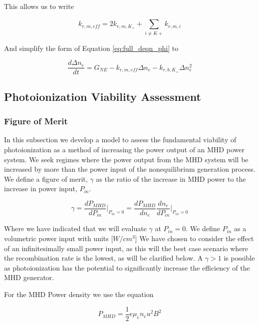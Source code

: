 This allows us to write

\begin{equation}
  k_{r, m, eff} = 2k_{r, m, K_{+}} + \sum_{i \neq K+}^{}k_{r, m, i}
\end{equation}

And simplify the form of Equation \ref{eq:full_deqn_phi} to

\begin{equation}
  \label{eq:final_deqn_Kp}
\frac{d\Delta n_{e}}{dt} = G_{NE}   -   k_{r, m, eff}\Delta n_{e} - k_{r, b, K_{+}}\Delta n_{e}^2
\end{equation}




\subsection{Photoionization Viability Assessment}

\subsubsection{Figure of Merit}

In this subsection we develop a model to assess the fundamental viability of photoionization as a method of increasing the power output of an MHD power system. We seek regimes where the power output from the MHD system will be increased by more than the power input of the nonequilibrium generation process. We define a figure of merit, $\gamma$ as the ratio of the increase in MHD power to the increase in power input, $P_{in}$.


\begin{equation}
  \label{eq:beta_def}
\gamma = \frac{dP_{MHD}}{dP_{in}} \Big|_{P_{in}=0} = \frac{dP_{MHD}}{dn_{e}}\frac{dn_{e}}{dP_{in}}\Big|_{P_{in}=0}
\end{equation}

Where we have indicated that we will evaluate $\gamma$ at $P_{in} = 0$. We define $P_{in}$ as a volumetric power input with units [$W/cm^3$] We have chosen to consider the effect of an infinitesimally small power input, as this will the best case scenario where the recombination rate is the lowest, as will be clarified below. A $\gamma > 1$ is possible as photoionization has the potential to significantly increase the efficiency of the MHD generator. 

For the MHD Power density we use the equation

\begin{equation}
  \label{eq:mhd_power}
P_{MHD} = \frac{1}{2} e \mu_e n_e u^2 B^2
\end{equation}

